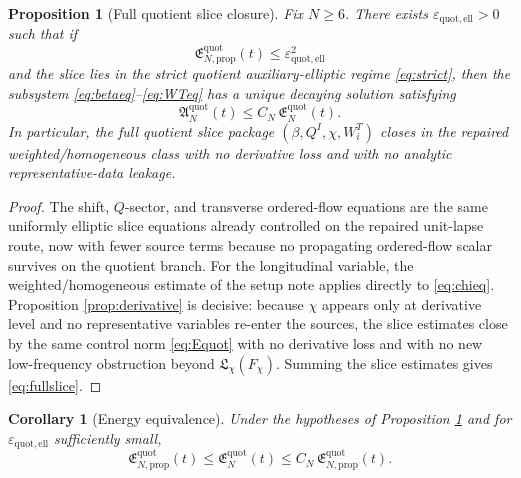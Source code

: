 \documentclass[11pt]{article}
\newtheorem{proposition}{Proposition}
\newtheorem{corollary}{Corollary}
\begin{document}
\begin{proposition}[Full quotient slice closure]
\label{prop:fullell}
Fix \(N\ge 6\). There exists \(\varepsilon_{\mathrm{quot,ell}}>0\) such that if
\begin{equation}
\mathfrak E_{N,\mathrm{prop}}^{\mathrm{quot}}(t)
\le
\varepsilon_{\mathrm{quot,ell}}^2
\label{eq:ellsmall}
\end{equation}
and the slice lies in the strict quotient auxiliary-elliptic regime \eqref{eq:strict}, then the subsystem \eqref{eq:betaeq}--\eqref{eq:WTeq} has a unique decaying solution satisfying
\begin{equation}
\mathfrak A_N^{\mathrm{quot}}(t)
\le
C_N\,\mathfrak E_N^{\mathrm{quot}}(t).
\label{eq:fullslice}
\end{equation}
In particular, the full quotient slice package \((\beta,Q^I,\chi,W_i^T)\) closes in the repaired weighted/homogeneous class with no derivative loss and with no analytic representative-data leakage.
\end{proposition}

\begin{proof}
The shift, \(Q\)-sector, and transverse ordered-flow equations are the same uniformly elliptic slice equations already controlled on the repaired unit-lapse route, now with fewer source terms because no propagating ordered-flow scalar survives on the quotient branch. For the longitudinal variable, the weighted/homogeneous estimate of the setup note applies directly to \eqref{eq:chieq}. Proposition \ref{prop:derivative} is decisive: because \(\chi\) appears only at derivative level and no representative variables re-enter the sources, the slice estimates close by the same control norm \eqref{eq:Equot} with no derivative loss and with no new low-frequency obstruction beyond \(\mathfrak L_\chi(F_\chi)\). Summing the slice estimates gives \eqref{eq:fullslice}.
\end{proof}

\begin{corollary}[Energy equivalence]
\label{cor:equiv}
Under the hypotheses of Proposition \ref{prop:fullell} and for \(\varepsilon_{\mathrm{quot,ell}}\) sufficiently small,
\begin{equation}
\mathfrak E_{N,\mathrm{prop}}^{\mathrm{quot}}(t)
\le
\mathfrak E_N^{\mathrm{quot}}(t)
\le
C_N\,\mathfrak E_{N,\mathrm{prop}}^{\mathrm{quot}}(t).
\label{eq:energyequiv}
\end{equation}
\end{corollary}
\end{document}
